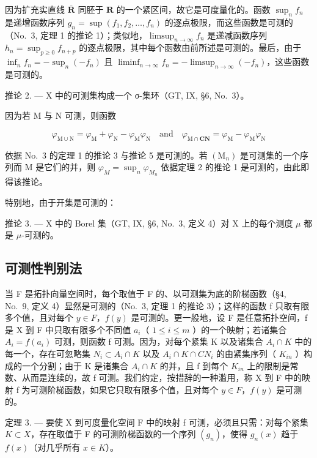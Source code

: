 因为扩充实直线 \(\overline{\mathbf{R}}\) 同胚于 \(\mathbf{R}\) 的一个紧区间，故它是可度量化的。函数 \(\sup_{n} f_n\) 是递增函数序列 \(g_n = \sup(f_1, f_2, \ldots, f_n)\) 的逐点极限，而这些函数是可测的（No.~3, 定理 1 的推论 1）；类似地，\(\limsup_{n \to \infty} f_n\) 是递减函数序列 \(h_n = \sup_{p \geqslant 0} f_{n+p}\) 的逐点极限，其中每个函数由前所述是可测的。最后，由于 \(\inf_{n} f_n = -\sup_{n} (-f_n)\) 且 \(\liminf_{n \to \infty} f_n = -\limsup_{n \to \infty} (-f_n)\)，这些函数是可测的。

推论 2. --- X 中的可测集构成一个 σ-集环（GT, IX, §6, No.~3）。

因为若 M 与 N 可测，则函数

\[
\varphi_ {\mathrm{M} \cup \mathrm{N}} = \varphi_ {\mathrm{M}} + \varphi_ {\mathrm{N}} - \varphi_ {\mathrm{M}} \varphi_ {\mathrm{N}} \quad \text {and} \quad \varphi_ {\mathrm{M} \cap \mathbf {C N}} = \varphi_ {\mathrm{M}} - \varphi_ {\mathrm{M}} \varphi_ {\mathrm{N}}
\]

依据 No.~3 的定理 1 的推论 3 与推论 5 是可测的。若 \((\mathrm{M}_{n})\) 是可测集的一个序列而 M 是它们的并，则 \(\varphi_{M} = \sup_{n} \varphi_{M_{n}}\) 依据定理 2 的推论 1 是可测的，由此即得该推论。

特别地，由于开集是可测的：

推论 3. --- X 中的 Borel 集（GT, IX, §6, No.~3, 定义 4）对 X 上的每个测度 \(\mu\) 都是 \(\mu\)-可测的。

\subsection{可测性判别法}

当 F 是拓扑向量空间时，每个取值于 F 的、以可测集为底的阶梯函数（§4, No.~9, 定义 4）显然是可测的（No.~3, 定理 1 的推论 3）；这样的函数 f 只取有限多个值，且对每个 \(y \in F\)，\(f(y)\) 是可测的。更一般地，设 F 是任意拓扑空间，f 是 X 到 F 中只取有限多个不同值 \(a_i\)（ \(1 \leqslant i \leqslant m\) ）的一个映射；若诸集合 \(A_i = f(a_i)\) 可测，则函数 f 可测。因为，对每个紧集 K 以及诸集合 \(A_i \cap K\) 中的每一个，存在可忽略集 \(N_i \subset A_i \cap K\) 以及 \(A_i \cap K \cap C N_i\) 的由紧集序列（ \(K_{in}\) ）构成的一个分割；由于 K 是诸集合 \(A_i \cap K\) 的并，且 f 到每个 \(K_{in}\) 上的限制是常数、从而是连续的，故 f 可测。我们约定，按措辞的一种滥用，称 X 到 F 中的映射 f 为可测阶梯函数，如果它只取有限多个值，且对每个 \(y \in F\)，\(f(y)\) 是可测的。

定理 3. --- 要使 X 到可度量化空间 F 中的映射 f 可测，必须且只需：对每个紧集 \(K \subset X\)，存在取值于 F 的可测阶梯函数的一个序列 \((g_{n})\)，使得 \(g_{n}(x)\) 趋于 \(f(x)\)（对几乎所有 \(x \in K\)）。

